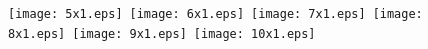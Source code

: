 \documentclass[12pt]{article}
\begin{document}
\hfill\texttt{[image: 5x1.eps]}\
\hfill\texttt{[image: 6x1.eps]}\
\hfill\texttt{[image: 7x1.eps]}\
\hfill\texttt{[image: 8x1.eps]}\
\hfill\texttt{[image: 9x1.eps]}\
\hfill\texttt{[image: 10x1.eps]}\
\hfill~
\end{document}
